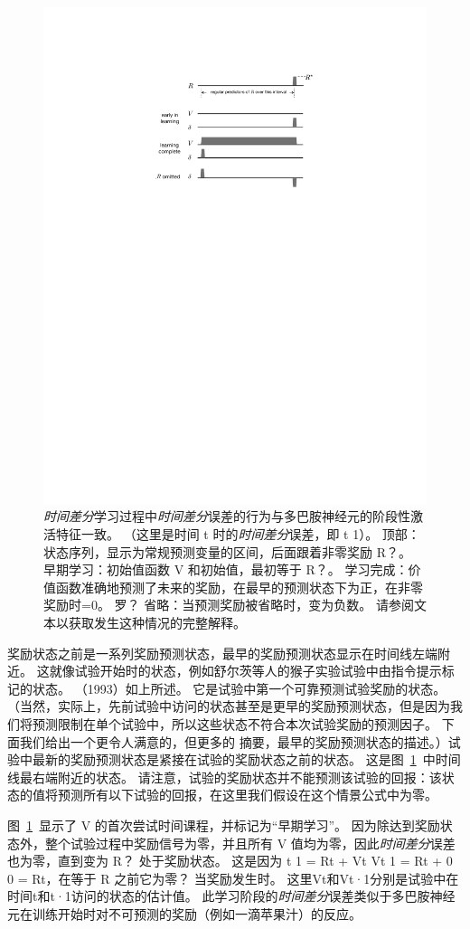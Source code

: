 \begin{figure}[!htb]
	\centering
	\includegraphics[width=0.5\linewidth]{chap12/fig_12_5}
	\caption{\textit{时间差分}学习过程中\textit{时间差分}误差的行为与多巴胺神经元的阶段性激活特征一致。
		（这里是时间 t 时的\textit{时间差分}误差，即 t 1）。
		顶部：状态序列，显示为常规预测变量的区间，后面跟着非零奖励 R？。
		早期学习：初始值函数 V 和初始值，最初等于 R？。
		学习完成：价值函数准确地预测了未来的奖励，在最早的预测状态下为正，在非零奖励时=0。
		罗？ 省略：当预测奖励被省略时，变为负数。
		请参阅文本以获取发生这种情况的完整解释。
		\label{fig:12_5}}
\end{figure}


奖励状态之前是一系列奖励预测状态，最早的奖励预测状态显示在时间线左端附近。
这就像试验开始时的状态，例如舒尔茨等人的猴子实验试验中由指令提示标记的状态。
（1993）如上所述。 它是试验中第一个可靠预测试验奖励的状态。
（当然，实际上，先前试验中访问的状态甚至是更早的奖励预测状态，但是因为我们将预测限制在单个试验中，所以这些状态不符合本次试验奖励的预测因子。
下面我们给出一个更令人满意的，但更多的 摘要，最早的奖励预测状态的描述。）试验中最新的奖励预测状态是紧接在试验的奖励状态之前的状态。
这是图~\ref{fig:12_5}~中时间线最右端附近的状态。
请注意，试验的奖励状态并不能预测该试验的回报：该状态的值将预测所有以下试验的回报，在这里我们假设在这个情景公式中为零。


图~\ref{fig:12_5}~显示了 V 的首次尝试时间课程，并标记为“早期学习”。 
因为除达到奖励状态外，整个试验过程中奖励信号为零，并且所有 V 值均为零，因此\textit{时间差分}误差也为零，直到变为 R？ 处于奖励状态。
这是因为 t 1 = Rt + Vt Vt 1 = Rt + 0 0 = Rt，在等于 R 之前它为零？ 
当奖励发生时。 这里Vt和Vt·1分别是试验中在时间t和t·1访问的状态的估计值。
此学习阶段的\textit{时间差分}误差类似于多巴胺神经元在训练开始时对不可预测的奖励（例如一滴苹果汁）的反应。



